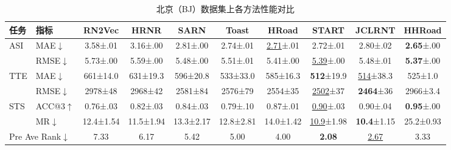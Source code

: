 \begin{table}[H]
    \centering
    \caption{北京（BJ）数据集上各方法性能对比}
    \label{tab:HHRoad_bj}
    \small
    \setlength{\tabcolsep}{4pt}
    \renewcommand{\arraystretch}{1.2}
    \begin{tabular}{llcccccccc}
        \toprule
        \textbf{任务} & \textbf{指标}
            & \textbf{RN2Vec} & \textbf{HRNR} & \textbf{SARN}
            & \textbf{Toast} & \textbf{HRoad} & \textbf{START}
            & \textbf{JCLRNT} & \textbf{HHRoad} \\
        \midrule
        \multirow{2}{*}{ASI}
            & MAE$\downarrow$
            & 3.58\tiny{±.01} & 3.16\tiny{±.00} & 2.81\tiny{±.00}
            & 2.74\tiny{±.01} & \underline{2.71}\tiny{±.01} & 2.72\tiny{±.01}
            & 2.80\tiny{±.02} & \textbf{2.65}\tiny{±.00} \\
            & RMSE$\downarrow$
            & 5.73\tiny{±.00} & 5.59\tiny{±.00} & 5.48\tiny{±.00}
            & 5.51\tiny{±.01} & 5.41\tiny{±.00} & \underline{5.39}\tiny{±.00}
            & 5.48\tiny{±.01} & \textbf{5.37}\tiny{±.00} \\
        \cmidrule(lr){1-10}
        \multirow{2}{*}{TTE}
            & MAE$\downarrow$
            & 661\tiny{±14.0} & 631\tiny{±19.3} & 596\tiny{±20.8}
            & 533\tiny{±33.0} & 585\tiny{±16.3} & \textbf{512}\tiny{±19.9}
            & \underline{514}\tiny{±38.3} & 525\tiny{±1.0} \\
            & RMSE$\downarrow$
            & 2978\tiny{±48} & 2968\tiny{±42} & 2581\tiny{±84}
            & 2576\tiny{±79} & 2554\tiny{±35} & \underline{2502}\tiny{±37}
            & \textbf{2464}\tiny{±36} & 2966\tiny{±3.4} \\
        \cmidrule(lr){1-10}
        \multirow{2}{*}{STS}
            & ACC@3$\uparrow$
            & 0.76\tiny{±.03} & 0.82\tiny{±.03} & 0.84\tiny{±.03}
            & 0.79\tiny{±.10} & 0.87\tiny{±.01} & \underline{0.90}\tiny{±.03}
            & 0.90\tiny{±.04} & \textbf{0.95}\tiny{±.00} \\
            & MR$\downarrow$
            & 12.4\tiny{±1.54} & 11.5\tiny{±1.94} & 13.3\tiny{±2.17}
            & 12.8\tiny{±2.81} & 14.0\tiny{±1.42} & \underline{10.9}\tiny{±1.98}
            & \textbf{10.4}\tiny{±1.15} & 25.2\tiny{±0.93} \\
        \midrule
        \multicolumn{2}{l}{Pre Ave Rank$\downarrow$}
            & 7.33 & 6.17 & 5.42 & 5.00 & 4.00 & \textbf{2.08} & \underline{2.67} & 3.33 \\
        \bottomrule
    \end{tabular}
\end{table}

